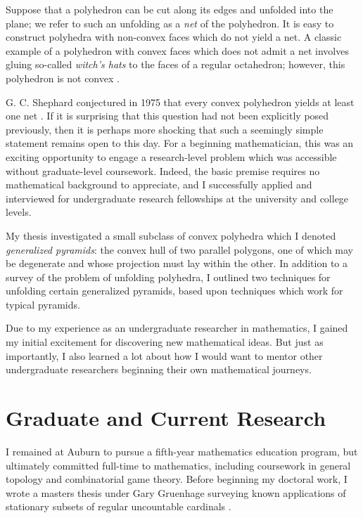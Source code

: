 \documentclass[11pt]{amsart}
\theoremstyle{plain}
\newcommand{\<}{\langle}
\renewcommand{\>}{\rangle}
\newcommand{\term}{\textit}
\begin{document}
Suppose that a polyhedron can be cut along its edges and unfolded into
the plane; we refer to such an unfolding as a \term{net} of the polyhedron.
It is easy to construct polyhedra with non-convex faces which do not
yield a net. A classic example of a polyhedron with convex faces which does
not admit a net involves gluing so-called \term{witch's hats} to the faces
of a regular octahedron; however, this polyhedron is not convex
\cite{UNUNFOLDABLE}.

G. C. Shephard conjectured in 1975 that every convex polyhedron yields at least
one net \cite{MR0390915}. If it is surprising that this question had
not been explicitly posed previously, then it is perhaps more shocking that
such a seemingly simple statement remains open to this day. For a beginning
mathematician, this was an exciting opportunity to engage a research-level
problem which was accessible without graduate-level coursework.
Indeed, the basic premise requires no mathematical background to appreciate,
and I successfully applied and interviewed for undergraduate research
fellowships at the university and college levels.

My thesis investigated a small subclass of convex polyhedra which I denoted
\term{generalized pyramids}: the convex hull of two parallel polygons, one of
which may be degenerate and whose projection must lay within the other.
In addition to a survey of the problem of unfolding polyhedra, I outlined
two techniques for unfolding certain generalized pyramids, based upon
techniques which work for typical pyramids.

Due to my experience as an undergraduate researcher in mathematics, I gained
my initial excitement for discovering new mathematical ideas. But just as
importantly, I also learned a lot about how I would want to mentor other
undergraduate researchers beginning their own mathematical journeys.


\section*{Graduate and Current Research}

I remained at Auburn to pursue a fifth-year mathematics education program,
but ultimately committed full-time to mathematics, including coursework in
general topology and combinatorial game theory. Before beginning my doctoral
work, I wrote a masters thesis
under Gary Gruenhage surveying known applications of stationary subsets of
regular uncountable cardinals \cite{MASTERS}.
\end{document}
